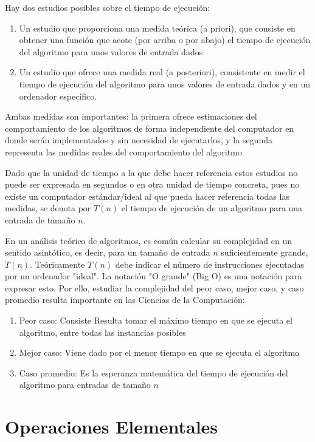 Hay dos estudios posibles sobre el tiempo de ejecución:

\begin{enumerate}
\item Un estudio que proporciona una medida teórica (a priori), que consiste en obtener una función que acote (por arriba o por abajo) el tiempo de ejecución del algoritmo para unos valores de entrada dados
\item Un estudio que ofrece una medida real (a posteriori), consistente en medir el tiempo de ejecución del algoritmo para unos valores de entrada dados y en un
ordenador específico. 
\end{enumerate}

Ambas medidas son importantes: la primera ofrece estimaciones del comportamiento de los algoritmos de forma independiente del computador en donde serán implementados y sin necesidad de ejecutarlos, y la segunda representa las medidas reales del comportamiento del algoritmo.

Dado que la unidad de tiempo a la que debe hacer referencia estos estudios no puede ser expresada en segundos o en otra unidad de tiempo concreta, pues no existe un computador estándar/ideal al que pueda hacer referencia todas las medidas, se denota por $T(n)$ el tiempo de ejecución de un algoritmo para una entrada de tamaño $n$. 

En un análisis teórico de algoritmos, es común calcular su complejidad en un sentido asintótico, es decir, para un tamaño de entrada $n$ suficientemente grande, $T(n)$. Teóricamente $T(n)$ debe indicar el número de instrucciones ejecutadas por un
ordenador "ideal". La notación "O grande" (Big O) es una notación para expresar esto. Por ello, estudiar la complejidad del peor caso, mejor caso, y caso promedio resulta importante en las Ciencias de la Computación:

\begin{enumerate}
\item Peor caso: Consiste Resulta tomar el máximo tiempo en que se ejecuta el algoritmo, entre todas las instancias posibles
\item Mejor caso: Viene dado por el menor tiempo en que se ejecuta el algoritmo
\item Caso promedio: Es la esperanza matemática del tiempo de ejecución del algoritmo para entradas de tamaño $n$
\end{enumerate}

\section{Operaciones Elementales}

